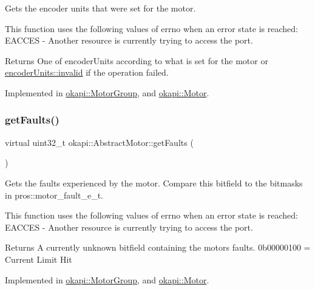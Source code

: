 Gets the encoder units that were set for the motor.

This function uses the following values of errno when an error state is reached\+: E\+A\+C\+C\+ES -\/ Another resource is currently trying to access the port.

\begin{DoxyReturn}{Returns}
One of encoder\+Units according to what is set for the motor or \mbox{\hyperlink{classokapi_1_1AbstractMotor_ae811cd825099f2defadeb1b7f7e7764cafedb2d84cafe20862cb4399751a8a7e3}{encoder\+Units\+::invalid}} if the operation failed. 
\end{DoxyReturn}


Implemented in \mbox{\hyperlink{classokapi_1_1MotorGroup_a1bc6347732e108a171b6e9a846722817}{okapi\+::\+Motor\+Group}}, and \mbox{\hyperlink{classokapi_1_1Motor_afcc6183588ce056927878dfc479e6fee}{okapi\+::\+Motor}}.

\mbox{\label{classokapi_1_1AbstractMotor_ae741463ec8de88c4f7ba854b5d6d7bce}} 
\subsubsection{\texorpdfstring{getFaults()}{getFaults()}}
{\footnotesize\ttfamily virtual uint32\+\_\+t okapi\+::\+Abstract\+Motor\+::get\+Faults (\begin{DoxyParamCaption}{ }\end{DoxyParamCaption})\hspace{0.3cm}{\ttfamily [pure virtual]}}

Gets the faults experienced by the motor. Compare this bitfield to the bitmasks in pros\+::motor\+\_\+fault\+\_\+e\+\_\+t.

This function uses the following values of errno when an error state is reached\+: E\+A\+C\+C\+ES -\/ Another resource is currently trying to access the port.

\begin{DoxyReturn}{Returns}
A currently unknown bitfield containing the motor\textquotesingle{}s faults. 0b00000100 = Current Limit Hit 
\end{DoxyReturn}


Implemented in \mbox{\hyperlink{classokapi_1_1MotorGroup_a1fece81a588e0d2ab40a08a1bcb86475}{okapi\+::\+Motor\+Group}}, and \mbox{\hyperlink{classokapi_1_1Motor_a7d16e9d0a3319a02a12476b5bec991d7}{okapi\+::\+Motor}}.

